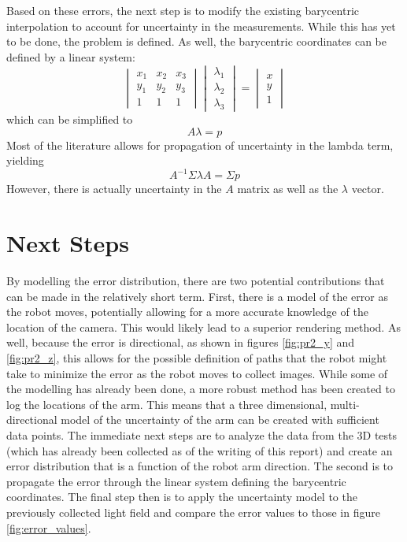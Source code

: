 \documentclass[12pt]{report}
\begin{document}
Based on these errors, the next step is to modify the existing barycentric interpolation to account for uncertainty in the measurements. While this has yet to be done, the problem is defined. As well, the barycentric coordinates can be defined by a linear system:
$$\begin{vmatrix}
x_1 &x_2 &x_3 \\ 
y_1 &y_2 &y_3 \\
1 &1 &1
\end{vmatrix}
\begin{vmatrix}
\lambda_1 \\
\lambda_2 \\
\lambda_3
\end{vmatrix}
=
\begin{vmatrix}
x \\
y \\
1
\end{vmatrix}
$$
which can be simplified to 
$$A\lambda=p$$
Most of the literature allows for propagation of uncertainty in the lambda term, yielding
$$
A^{-1}\Sigma \lambda A=\Sigma p
$$
However, there is actually uncertainty in the $A$ matrix as well as the $\lambda$ vector. 

\section{Next Steps}
By modelling the error distribution, there are two potential contributions that can be made in the relatively short term. First, there is a model of the error as the robot moves, potentially allowing for a more accurate knowledge of the location of the camera. This would likely lead to a superior rendering method. As well, because the error is directional, as shown in figures \ref{fig:pr2_y} and \ref{fig:pr2_z}, this allows for the possible definition of paths that the robot might take to minimize the error as the robot moves to collect images. While some of the modelling has already been done, a more robust method has been created to log the locations of the arm. This means that a three dimensional, multi-directional model of the uncertainty of the arm can be created with sufficient data points. The immediate next steps are to analyze the data from the 3D tests (which has already been collected as of the writing of this report) and create an error distribution that is a function of the robot arm direction. The second is to propagate the error through the linear system defining the barycentric coordinates. The final step then is to apply the uncertainty model to the previously collected light field and compare the error values to those in figure \ref{fig:error_values}.
\end{document}
